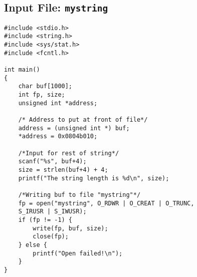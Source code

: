 \documentclass[a4paper,12pt]{article}
\begin{document}
\subsection{Input File: \texttt{mystring}}
\label{Appsec:3.2}
\begin{verbatim}
#include <stdio.h>
#include <string.h>
#include <sys/stat.h>
#include <fcntl.h>

int main()
{
    char buf[1000];
    int fp, size;
    unsigned int *address;
    
    /* Address to put at front of file*/
    address = (unsigned int *) buf;
    *address = 0x0804b010;
    
    /*Input for rest of string*/
    scanf("%s", buf+4);
    size = strlen(buf+4) + 4;
    printf("The string length is %d\n", size);
    
    /*Writing buf to file "mystring"*/
    fp = open("mystring", O_RDWR | O_CREAT | O_TRUNC,
    S_IRUSR | S_IWUSR);
    if (fp != -1) {
        write(fp, buf, size);
        close(fp);
    } else {
        printf("Open failed!\n");
    }
}
\end{verbatim}
\end{document}
